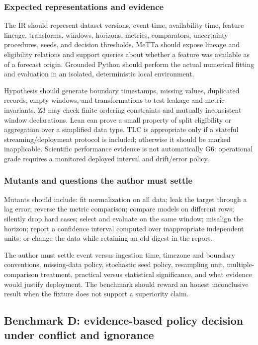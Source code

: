 \documentclass[11pt]{article}
\begin{document}
\subsubsection*{Expected representations and evidence}

The IR should represent dataset versions, event time, availability time,
feature lineage, transforms, windows, horizons, metrics, comparators,
uncertainty procedures, seeds, and decision thresholds.  MeTTa should expose
lineage and eligibility relations and support queries about whether a feature
was available as of a forecast origin.  Grounded Python should perform the
actual numerical fitting and evaluation in an isolated, deterministic local
environment.

Hypothesis should generate boundary timestamps, missing values, duplicated
records, empty windows, and transformations to test leakage and metric
invariants.  Z3 may check finite ordering constraints and mutually inconsistent
window declarations.  Lean can prove a small property of split eligibility or
aggregation over a simplified data type.  TLC is appropriate only if a
stateful streaming/deployment protocol is included; otherwise it should be
marked inapplicable.  Scientific performance evidence is not automatically
G6: operational grade requires a monitored deployed interval and drift/error
policy.

\subsubsection*{Mutants and questions the author must settle}

Mutants should include: fit normalization on all data; leak the target through
a lag error; reverse the metric comparison; compare models on different rows;
silently drop hard cases; select and evaluate on the same window; misalign the
horizon; report a confidence interval computed over inappropriate independent
units; or change the data while retaining an old digest in the report.

The author must settle event versus ingestion time, timezone and boundary
conventions, missing-data policy, stochastic seed policy, resampling unit,
multiple-comparison treatment, practical versus statistical significance,
and what evidence would justify deployment.  The benchmark should reward an
honest inconclusive result when the fixture does not support a superiority
claim.

\subsection{Benchmark D: evidence-based policy decision under conflict and ignorance}
\end{document}
